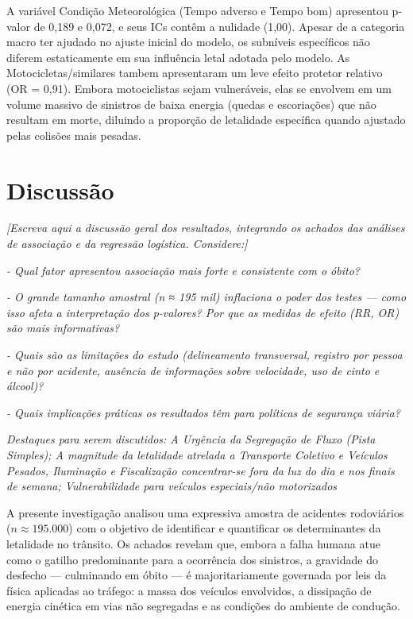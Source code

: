\documentclass[
  brazilian,
  12pt,
]{article}
\begin{document}
A variável Condição Meteorológica (Tempo adverso e Tempo bom) apresentou
p-valor de 0,189 e 0,072, e seus ICs contêm a nulidade (1,00). Apesar de
a categoria macro ter ajudado no ajuste inicial do modelo, os subníveis
específicos não diferem estaticamente em sua influência letal adotada
pelo modelo. As Motocicletas/similares tambem apresentaram um leve
efeito protetor relativo (OR = 0,91). Embora motociclistas sejam
vulneráveis, elas se envolvem em um volume massivo de sinistros de baixa
energia (quedas e escoriações) que não resultam em morte, diluindo a
proporção de letalidade específica quando ajustado pelas colisões mais
pesadas.

\newpage

\section{Discussão}\label{discussuxe3o}

\emph{{[}Escreva aqui a discussão geral dos resultados, integrando os
achados das análises de associação e da regressão logística.
Considere:{]}}

\emph{- Qual fator apresentou associação mais forte e consistente com o
óbito?}

\emph{- O grande tamanho amostral (n ≈ 195 mil) inflaciona o poder dos
testes --- como isso afeta a interpretação dos p-valores? Por que as
medidas de efeito (RR, OR) são mais informativas?}

\emph{- Quais são as limitações do estudo (delineamento transversal,
registro por pessoa e não por acidente, ausência de informações sobre
velocidade, uso de cinto e álcool)?}

\emph{- Quais implicações práticas os resultados têm para políticas de
segurança viária?}

\emph{Destaques para serem discutidos: A Urgência da Segregação de Fluxo
(Pista Simples); A magnitude da letalidade atrelada a Transporte
Coletivo e Veículos Pesados, Iluminação e Fiscalização concentrar-se
fora da luz do dia e nos finais de semana; Vulnerabilidade para veículos
especiais/não motorizados}

A presente investigação analisou uma expressiva amostra de acidentes
rodoviários (\(n \approx 195.000\)) com o objetivo de identificar e
quantificar os determinantes da letalidade no trânsito. Os achados
revelam que, embora a falha humana atue como o gatilho predominante para
a ocorrência dos sinistros, a gravidade do desfecho --- culminando em
óbito --- é majoritariamente governada por leis da física aplicadas ao
tráfego: a massa dos veículos envolvidos, a dissipação de energia
cinética em vias não segregadas e as condições do ambiente de condução.
\end{document}
